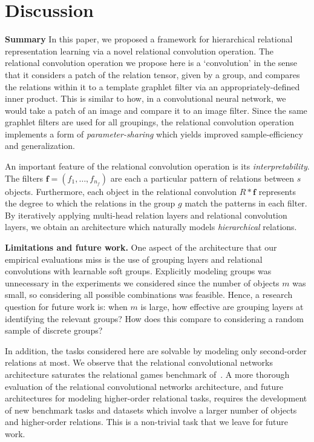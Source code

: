 
\section{Discussion}\label{sec:discussion}

\textbf{Summary} In this paper, we proposed a framework for hierarchical relational representation learning via a novel relational convolution operation. The relational convolution operation we propose here is a `convolution' in the sense that it considers a patch of the relation tensor, given by a group, and compares the relations within it to a template graphlet filter via an appropriately-defined inner product. This is similar to how, in a convolutional neural network, we would take a patch of an image and compare it to an image filter. Since the same graphlet filters are used for all groupings, the relational convolution operation implements a form of \textit{parameter-sharing} which yields improved sample-efficiency and generalization.

An important feature of the relational convolution operation is its \textit{interpretability}. The filters $\bm{f} = (f_1, \ldots, f_{n_f})$ are each a particular pattern of relations between $s$ objects. Furthermore, each object in the relational convolution $R \ast \bm{f}$ represents the degree to which the relations in the group $g$ match the patterns in each filter. By iteratively applying multi-head relation layers and relational convolution layers, we obtain an architecture which naturally models \textit{hierarchical} relations.

\textbf{Limitations and future work.} One aspect of the architecture that our empirical evaluations miss is the use of grouping layers and relational convolutions with learnable soft groups. Explicitly modeling groups was unnecessary in the experiments we considered since the number of objects $m$ was small, so considering all possible combinations was feasible. Hence, a research question for future work is: when $m$ is large, how effective are grouping layers at identifying the relevant groups? How does this compare to considering a random sample of discrete groups?

In addition, the tasks considered here are solvable by modeling only second-order relations at most. We observe that the relational convolutional networks architecture saturates the relational games benchmark of~\citep{shanahanExplicitlyRelationalNeural}. A more thorough evaluation of the relational convolutional networks architecture, and future architectures for modeling higher-order relational tasks, requires the development of new benchmark tasks and datasets which involve a larger number of objects and higher-order relations. This is a non-trivial task that we leave for future work.


